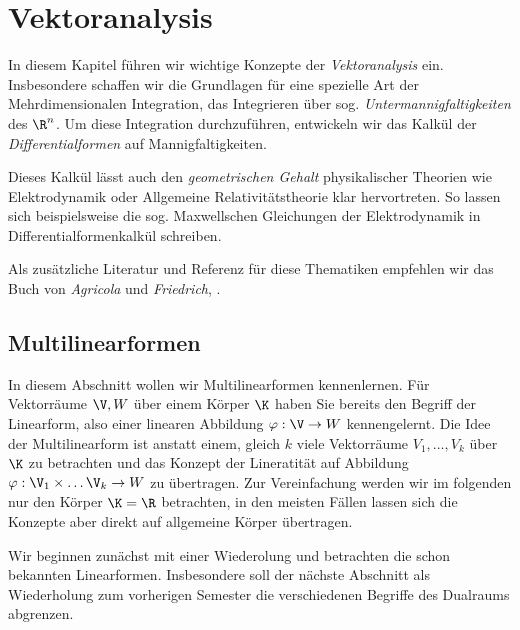 \chapter{Vektoranalysis}
\label{\detokenize{vektoranalysis/vektoranalysis:vektoranalysis}}\label{\detokenize{vektoranalysis/vektoranalysis::doc}}
\par
In diesem Kapitel führen wir wichtige Konzepte der \emph{Vektoranalysis} ein. Insbesondere schaffen wir die Grundlagen für eine spezielle Art der Mehrdimensionalen Integration, das Integrieren über sog. \emph{Untermannigfaltigkeiten} des \(\R^n\).
Um diese Integration durchzuführen, entwickeln wir das Kalkül der \emph{Differentialformen} auf Mannigfaltigkeiten.

\par
Dieses Kalkül lässt auch den \emph{geometrischen Gehalt} physikalischer
Theorien wie Elektrodynamik oder Allgemeine Relativitätstheorie klar
hervortreten. So lassen sich beispielsweise die sog. Maxwellschen Gleichungen der
Elektrodynamik in Differentialformenkalkül schreiben.

\par
Als zusätzliche Literatur und Referenz für diese Thematiken empfehlen wir das Buch von \emph{Agricola} und \emph{Friedrich}, \cite{AF13}.


\section{Multilinearformen}
\label{\detokenize{vektoranalysis/multilinear:multilinearformen}}\label{\detokenize{vektoranalysis/multilinear::doc}}
\par
In diesem Abschnitt wollen wir Multilinearformen kennenlernen. Für Vektorräume \(\V, W\) über einem Körper \(\K\) haben Sie bereits den Begriff der Linearform, also einer linearen Abbildung \(\varphi:\V\rightarrow W\) kennengelernt. Die Idee der Multilinearform ist anstatt einem, gleich \(k\) viele Vektorräume \(V_1,\ldots,V_k\) über \(\K\) zu betrachten und das Konzept der Lineratität auf Abbildung \(\varphi:\V_1\times\ldots\V_k\rightarrow W\) zu übertragen. Zur Vereinfachung werden wir im folgenden nur den Körper \(\K=\R\) betrachten, in den meisten Fällen lassen sich die Konzepte aber direkt auf allgemeine Körper übertragen.

\par
Wir beginnen zunächst mit einer Wiederolung und betrachten die schon bekannten Linearformen. Insbesondere soll der nächste Abschnitt als Wiederholung zum vorherigen Semester die verschiedenen Begriffe des Dualraums abgrenzen.


